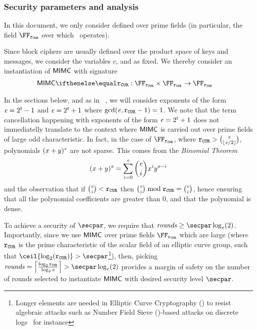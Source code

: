 \subsubsection{Security parameters and analysis}\label{instantiation:mkhash:mimc-encryption:security}

In this document, we only consider \mimc{} defined over prime fields (in particular, the field $\FFx{\rCURVE}$ over which \zksnark~operates).

Since block ciphers are usually defined over the product space of keys and messages, we consider the variables $c$, \rounds{} and \exponent{} as fixed. We thereby consider an instantiation of $\mathsf{MIMC{}}$ with signature
\begin{align*}
    \mimcPrime{\rCURVE} &: \FFx{\rCURVE} \times \FFx{\rCURVE} \to \FFx{\rCURVE}
\end{align*}

In the sections below, and as in ~\cite{albrecht2016mimc}, we will consider exponents of the form $\mathit{e}{} = 2^t-1$ and $\mathit{e}{} = 2^t+1$ where $\gcd(\mathit{e}{}, \mathtt{r_{CUR}}-1) = 1$. We note that the term cancellation happening with exponents of the form $\mathit{e}{} = 2^t+1$ does not immediatelly translate to the context where $\mathsf{MIMC{}}$ is carried out over prime fields of large odd characteristic. In fact, in the case of $\FFx{\rCURVE}$, where $\mathtt{r_{CUR}} > \binom{\mathit{e}}{\lfloor \mathit{e} / 2 \rfloor}$, polynomials $(x + y)^{\mathit{e}}$ are not sparse.
This comes from the \emph{Binomial Theorem}
\[
  (x + y)^{\mathit{e}} = \sum_{i = 0}^{\mathit{e}} \binom{\mathit{e}}{i} x^{i}y^{\mathit{e} - i}
\]
and the observation that if $\binom{\mathit{e}}{i} < \mathtt{r_{CUR}}$ then $\binom{\mathit{e}}{i} \bmod \mathtt{r_{CUR}} = \binom{\mathit{e}}{i}$, hence ensuring that all the polynomial coefficients are greater than $0$, and that the polynomial is dense.

To achieve a security of $\secpar$, we require that $\rounds \geq \secpar \log_{\exponent}(2)$.
Importantly, since we use $\mathsf{MIMC{}}$ over prime fields $\FFx{\rCURVE}$ which are large (where $\mathtt{r_{CUR}}$ is the prime characteristic of the scalar field of an elliptic curve group, such that $\ceil{\log_2(\rCURVE)} > \secpar$\footnote{Longer elements are needed in Elliptic Curve Cryptography (\ecc) to resist algebraic attacks such as Number Field Sieve (\acrnfs)-based attacks on discrete logs~\cite{DBLP:journals/siamdm/Gordon93} for instance}), then, picking $\rounds = \left\lceil \frac{\log_2 \rCURVE}{\log_2 \exponent{}} \right\rceil > \secpar \log_{\exponent}(2)$ provides a margin of safety on the number of rounds selected to instantiate $\mathsf{MIMC{}}$ with desired security level $\secpar$.

